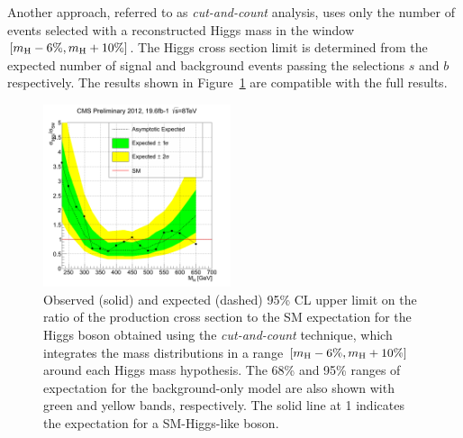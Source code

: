 Another approach, referred to as \textit{cut-and-count} analysis,
 uses only the number of events selected with a reconstructed Higgs mass in the 
window $[m_{\mathrm{H}} -6\%, m_{\mathrm{H}}+10\%]$. The Higgs cross section limit is determined from the expected number of signal
and background events passing the selections $s$ and $b$ respectively.
The results shown in Figure~\ref{fig:cutcount} are compatible with the full results.

\begin{figure}[htbp]
 \begin{center}
 \centerline{
 \includegraphics[width=0.49\textwidth]{plots/limit_CiC_unblinded_win0.png}
}
\caption{
Observed (solid) and expected (dashed) 95\% CL upper limit
on the ratio of the production cross section to the SM expectation
for the Higgs boson obtained using the \textit{cut-and-count} technique,
which integrates the mass distributions in a
range $[m_{\mathrm{H}} -6\%, m_{\mathrm{H}}+10\%]$ around each Higgs mass hypothesis.
The 68\% and 95\% ranges of expectation
for the background-only model are also shown with green and
yellow bands, respectively.  The solid line at 1 indicates the expectation
for a SM-Higgs-like boson.
}
\label{fig:cutcount}
\end{center}
\end{figure}

